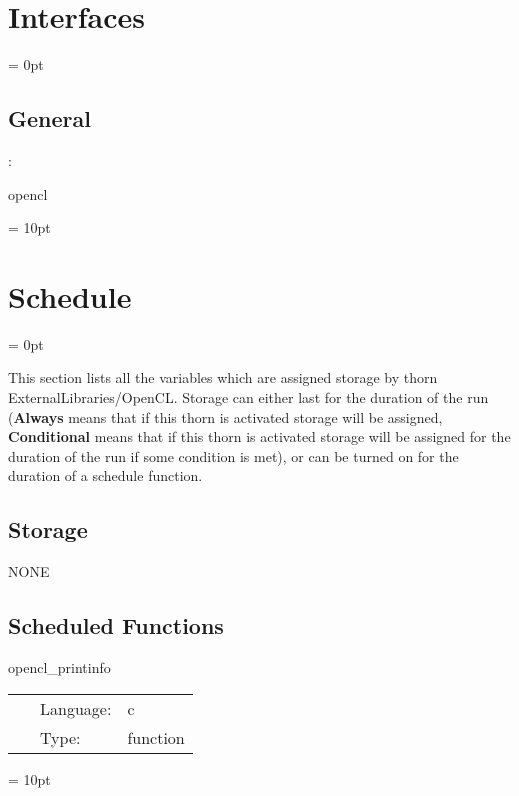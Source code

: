 \section{Interfaces} 


\parskip = 0pt

\vspace{3mm} \subsection*{General}

: 

opencl
\vspace{2mm}

\vspace{5mm}\parskip = 10pt 

\section{Schedule} 


\parskip = 0pt


\noindent This section lists all the variables which are assigned storage by thorn ExternalLibraries/OpenCL.  Storage can either last for the duration of the run ({\bf Always} means that if this thorn is activated storage will be assigned, {\bf Conditional} means that if this thorn is activated storage will be assigned for the duration of the run if some condition is met), or can be turned on for the duration of a schedule function.


\subsection*{Storage}NONE
\subsection*{Scheduled Functions}
\vspace{5mm}


\hspace{5mm} opencl\_printinfo 

\hspace{5mm}{\it print opencl system information } 


\hspace{5mm}

 \begin{tabular*}{160mm}{cll} 
~ & Language:  & c \\ 
~ & Type:  & function \\ 
\end{tabular*} 



\vspace{5mm}\parskip = 10pt 

